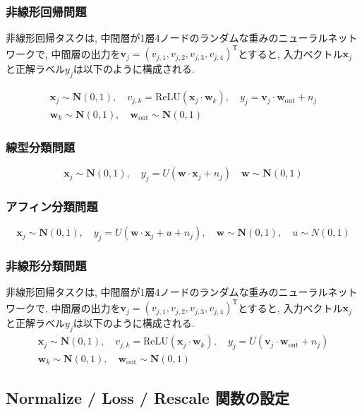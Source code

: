 \documentclass[11pt,oneside,openany,report]{jsbook}
\begin{document}
\subsubsection{非線形回帰問題}
非線形回帰タスクは, 中間層が1層4ノードのランダムな重みのニューラルネットワークで, 中間層の出力を$\bm{v}_{j}=\left(v_{j, 1}, v_{j, 2}, v_{j, 3}, v_{j, 4}\right)^{\mathrm{T}}$とすると, 入力ベクトル$\bm{x}_j$と正解ラベル$y_j$は以下のように構成される.

\begin{gather*}
  \bm{x}_j \sim \bm{N}(0, 1), \quad v_{j, k} = \mathrm{ReLU}\left(\bm{x}_{j} \cdot \bm{w}_{k}\right), \quad y_j = \bm{v}_{j} \cdot \bm{w}_{\mathrm{out}} + n_j \\
\bm{w}_{k} \sim \bm{N}(0, 1), \quad \bm{w}_{\mathrm{out}} \sim \bm{N}(0, 1)
\end{gather*}

\subsubsection{線型分類問題}
$$
  \bm{x}_j \sim \bm{N}(0, 1), \quad y_j = U(\bm{w} \cdot \bm{x}_j + n_j) \quad
  \bm{w} \sim \bm{N}(0, 1)
$$

\subsubsection{アフィン分類問題}
$$
  \bm{x}_j \sim \bm{N}(0, 1), \quad y_j = U(\bm{w} \cdot \bm{x}_j + u + n_j),\quad \bm{w} \sim \bm{N}(0, 1), \quad u \sim N(0, 1)
$$

\subsubsection{非線形分類問題}
非線形回帰タスクは, 中間層が1層4ノードのランダムな重みのニューラルネットワークで, 中間層の出力を$\bm{v}_{j}=\left(v_{j, 1}, v_{j, 2}, v_{j, 3}, v_{j, 4}\right)^{\mathrm{T}}$とすると, 入力ベクトル$\bm{x}_j$と正解ラベル$y_j$は以下のように構成される.
\begin{gather*}
  \bm{x}_j \sim \bm{N}(0, 1), \quad v_{j, k} = \mathrm{ReLU}\left(\bm{x}_{j} \cdot \bm{w}_{k}\right), \quad y_j = U(\bm{v}_{j} \cdot \bm{w}_{\mathrm{out}} + n_j) \\
\bm{w}_{k} \sim \bm{N}(0, 1), \quad \bm{w}_{\mathrm{out}} \sim \bm{N}(0, 1)
\end{gather*}

\subsection{Normalize / Loss / Rescale 関数の設定} \label{sec:exp:functions}
\end{document}
